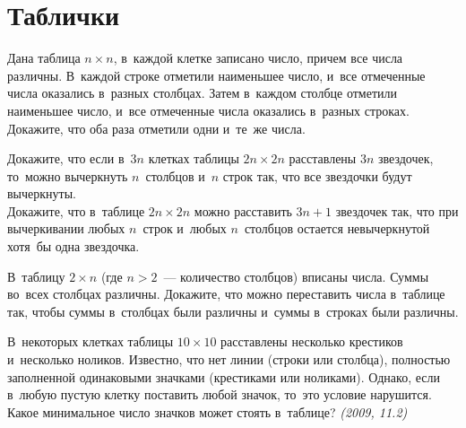 
\section*{Таблички}


\begin{problems}


\item
Дана таблица $n \times n$, в~каждой клетке записано число, причем все числа
различны.
В~каждой строке отметили наименьшее число, и~все отмеченные числа оказались
в~разных столбцах.
Затем в~каждом столбце отметили наименьшее число, и~все отмеченные числа
оказались в~разных строках.
Докажите, что оба раза отметили одни и~те~же числа.

\item
\subproblem
Докажите, что если в~$3 n$ клетках таблицы $2 n \times 2 n$ расставлены $3 n$
звездочек, то~можно вычеркнуть $n$~столбцов и~$n$ строк так, что все звездочки
будут вычеркнуты.
\\
\subproblem
Докажите, что в~таблице $2 n \times 2 n$ можно расставить $3 n + 1$ звездочек
так, что при вычеркивании любых $n$~строк и~любых $n$~столбцов остается
невычеркнутой хотя~бы одна звездочка.

\item
В~таблицу $2 \times n$ (где $n > 2$~--- количество столбцов) вписаны числа.
Суммы во~всех столбцах различны.
Докажите, что можно переставить числа в~таблице так, чтобы суммы в~столбцах
были различны и~суммы в~строках были различны.

\item
В~некоторых клетках таблицы $10 \times 10$ расставлены несколько крестиков
и~несколько ноликов.
Известно, что нет линии (строки или столбца), полностью заполненной одинаковыми
значками (крестиками или ноликами).
Однако, если в~любую пустую клетку поставить любой значок, то~это условие
нарушится.
Какое минимальное число значков может стоять в~таблице?
\emph{(2009, 11.2)}


\end{problems}
